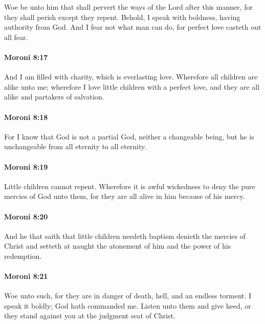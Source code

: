 			Woe be unto him that shall pervert the ways of the Lord after this manner,
			for they shall perish except they repent.
			Behold, I speak with boldness,
			having authority from God.
			And I fear not what man can do,
			for perfect love casteth out all fear.

		\paragraph{Moroni 8:17} %
			\label{MORONI-8-17}

			And I am filled with charity, which is everlasting love.
			Wherefore all children are alike unto me;
			wherefore I love little children with a perfect love,
			and they are all alike and partakers of salvation.

		\paragraph{Moroni 8:18} %
			\label{MORONI-8-18}

			For I know that God is not a partial God, neither a changeable being,
			but he is unchangeable from all eternity to all eternity.

		\paragraph{Moroni 8:19} %
			\label{MORONI-8-19}

			Little children cannot repent.
			Wherefore it is awful wickedness
			to deny the pure mercies of God unto them,
			for they are all alive in him because of his mercy.

		\paragraph{Moroni 8:20} %
			\label{MORONI-8-20}

			And he that saith that little children needeth baptism
			denieth the mercies of Christ
			and setteth at naught the atonement of him
			and the power of his redemption.

		\paragraph{Moroni 8:21} %
			\label{MORONI-8-21}

			Woe unto such,
			for they are in danger of death, hell, and an endless torment.
			I speak it boldly;
			God hath commanded me.
			Listen unto them and give heed,
			or they stand against you at the judgment seat of Christ.

